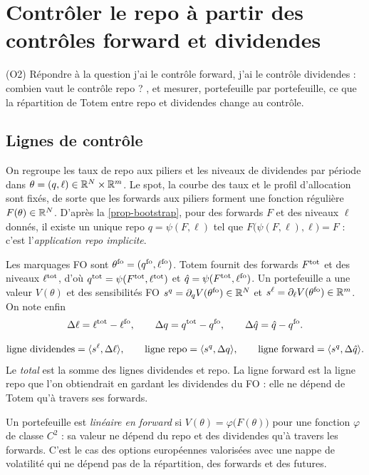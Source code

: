 \section{Contrôler le repo à partir des contrôles forward et dividendes}\label{sec-controle}

\begin{objectif}
(O2) Répondre à la question \og j'ai le contrôle forward, j'ai le contrôle dividendes : combien vaut le contrôle
repo ? \fg{}, et mesurer, portefeuille par portefeuille, ce que la répartition de Totem entre repo et dividendes change
au contrôle.
\end{objectif}

\subsection{Lignes de contrôle}
On regroupe les taux de repo aux piliers et les niveaux de dividendes par période dans
$\theta=(q, \ell)\in\mathbb{R}^N\times\mathbb{R}^m$. Le spot, la courbe des taux et le profil d'allocation sont fixés, de sorte que les
forwards aux piliers forment une fonction régulière $F(\theta)\in\mathbb{R}^N$. D'après la \cref{prop-bootstrap}, pour des
forwards $F$ et des niveaux $\ell$ donnés, il existe un unique repo $q=\psi(F, \ell)$ tel que
$F\bigl(\psi(F, \ell), \ell\bigr)=F$ : c'est l'\emph{application repo implicite}.

Les marquages FO sont $\theta^{\mathrm{fo}}=(q^{\mathrm{fo}}, \ell^{\mathrm{fo}})$. Totem fournit des forwards $F^{\mathrm{tot}}$ et des niveaux
$\ell^{\mathrm{tot}}$, d'où $q^{\mathrm{tot}}=\psi(F^{\mathrm{tot}}, \ell^{\mathrm{tot}})$ et $\hat q=\psi(F^{\mathrm{tot}}, \ell^{\mathrm{fo}})$. Un portefeuille a une
valeur $V(\theta)$ et des sensibilités FO $s^q=\partial_qV(\theta^{\mathrm{fo}})\in\mathbb{R}^N$ et
$s^\ell=\partial_\ell V(\theta^{\mathrm{fo}})\in\mathbb{R}^m$. On note enfin
\[
\Delta\ell=\ell^{\mathrm{tot}}-\ell^{\mathrm{fo}}, \qquad\Delta q=q^{\mathrm{tot}}-q^{\mathrm{fo}}, \qquad\Delta\hat q=\hat q-q^{\mathrm{fo}}.
\]

\begin{definition}\label{def-lines}
\[
\text{ligne dividendes}=\langle s^\ell, \Delta\ell\rangle, \qquad\text{ligne repo}=\langle s^q, \Delta q\rangle, \qquad
\text{ligne forward}=\langle s^q, \Delta\hat q\rangle.
\]
Le \emph{total} est la somme des lignes dividendes et repo. La ligne forward est la ligne repo que l'on obtiendrait en
gardant les dividendes du FO : elle ne dépend de Totem qu'à travers ses forwards.
\end{definition}

\begin{definition}\label{def-fwdlinear}
Un portefeuille est \emph{linéaire en forward} si $V(\theta)=\varphi\bigl(F(\theta)\bigr)$ pour une fonction $\varphi$
de classe $C^2$ : sa valeur ne dépend du repo et des dividendes qu'à travers les forwards. C'est le cas des options
européennes valorisées avec une nappe de volatilité qui ne dépend pas de la répartition, des forwards et des futures.
\end{definition}

